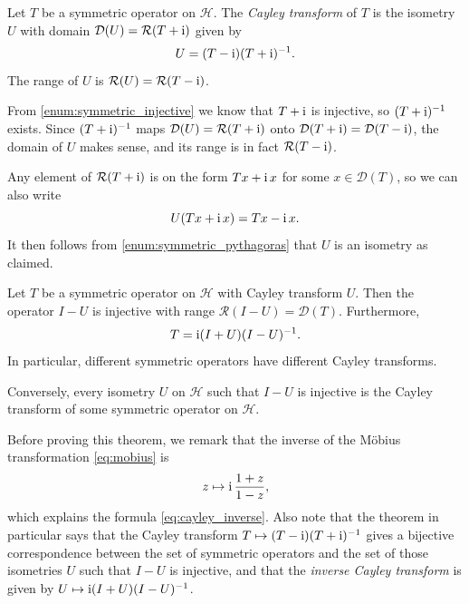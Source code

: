 \documentclass[article, a4paper, 11pt, oneside]{memoir}
\numberwithin{equation}{chapter}
\newcommand{\calH}{\mathcal{H}}
\newcommand{\dom}{\mathcal{D}}
\newcommand{\range}{\mathcal{R}}
\theoremstyle{myexample}
\theoremstyle{myexample}
\theoremstyle{myexamplebreak}
\theoremstyle{myexamplebreak}
\theoremstyle{nonumberplain}
\theoremstyle{MyNonumberplain}
\begin{document}
\begin{definition}
    Let $T$ be a symmetric operator on $\calH$. The \emph{Cayley transform} of $T$ is the isometry $U$ with domain $\dom(U) = \range(T + \iu)$ given by
    \begin{equation*}
        U = (T - \operatorname{i}) (T + \operatorname{i})^{-1}.
    \end{equation*}
    The range of $U$ is $\range(U) = \range(T - \iu)$.
\end{definition}
%
From \cref{enum:symmetric_injective} we know that $T + \operatorname{i}$ is injective, so $(T + \operatorname{i})^{-1}$ exists. Since $(T + \operatorname{i})^{-1}$ maps $\dom(U) = \range(T + \iu)$ onto $\dom(T + \iu) = \dom(T - \iu)$, the domain of $U$ makes sense, and its range is in fact $\range(T - \iu)$.

Any element of $\range(T + \iu)$ is on the form $Tx + \operatorname{i} x$ for some $x \in \dom(T)$, so we can also write
%
\begin{equation*}
    U(Tx + \operatorname{i} x) = Tx - \operatorname{i} x.
\end{equation*}
%
It then follows from \cref{enum:symmetric_pythagoras} that $U$ is an isometry as claimed.


\begin{theorem}
    \label{thm:cayley_inverse}
    Let $T$ be a symmetric operator on $\calH$ with Cayley transform $U$. Then the operator $I - U$ is injective with range $\range(I - U) = \dom(T)$. Furthermore,
    \begin{equation}
        \label{eq:cayley_inverse}
        T = \operatorname{i} (I + U)(I - U)^{-1}.
    \end{equation}
    In particular, different symmetric operators have different Cayley transforms.
    
    Conversely, every isometry $U$ on $\calH$ such that $I - U$ is injective is the Cayley transform of some symmetric operator on $\calH$.
\end{theorem}
%
Before proving this theorem, we remark that the inverse of the Möbius transformation \eqref{eq:mobius} is
%
\begin{equation*}
    z \mapsto \operatorname{i} \frac{1 + z}{1 - z},
\end{equation*}
%
which explains the formula \eqref{eq:cayley_inverse}. Also note that the theorem in particular says that the Cayley transform $T \mapsto (T - \operatorname{i})(T + \operatorname{i})^{-1}$ gives a bijective correspondence between the set of symmetric operators and the set of those isometries $U$ such that $I - U$ is injective, and that the \emph{inverse Cayley transform} is given by $U \mapsto \operatorname{i} (I + U)(I - U)^{-1}$.
\end{document}
